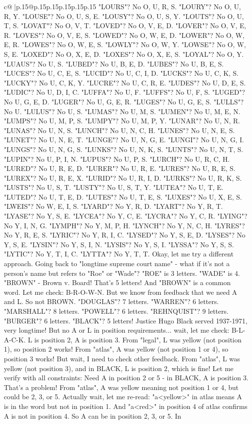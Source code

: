 \documentclass{article}
\begin{document}
{\begin{supertabular}{c@{$\;$}|p{.15\linewidth}@{}p{.15\linewidth}p{.15\linewidth}p{.15\linewidth}p{.15\linewidth}p{.15\linewidth}}
{{{"LOURS"? No O, U, R, S. "LOURY"? No O, U, R, Y. "LOUSE"? No O, U, S, E. "LOUSY"? No O, U, S, Y. "LOUTS"? No O, U, T, S. "LOVAT"? No O, V, T. "LOVED"? No O, V, E, D. "LOVER"? No O, V, E, R. "LOVES"? No O, V, E, S. "LOWED"? No O, W, E, D. "LOWER"? No O, W, E, R. "LOWES"? No O, W, E, S. "LOWLY"? No O, W, Y. "LOWSE"? No O, W, S, E. "LOXED"? No O, X, E, D. "LOXES"? No O, X, E, S. "LOYAL"? No O, Y. "LUAUS"? No U, S. "LUBED"? No U, B, E, D. "LUBES"? No U, B, E, S. "LUCES"? No U, C, E, S. "LUCID"? No U, C, I, D. "LUCKS"? No U, C, K, S. "LUCKY"? No U, C, K, Y. "LUCRE"? No U, C, R, E. "LUDES"? No U, D, E, S. "LUDIC"? No U, D, I, C. "LUFFA"? No U, F. "LUFFS"? No U, F, S. "LUGED"? No U, G, E, D. "LUGER"? No U, G, E, R. "LUGES"? No U, G, E, S. "LULLS"? No U. "LULUS"? No U, S. "LUMAS"? No U, M, S. "LUMEN"? No U, M, E, N. "LUMPS"? No U, M, P, S. "LUMPY"? No U, M, P, Y. "LUNAR"? No U, N, R. "LUNAS"? No U, N, S. "LUNCH"? No U, N, C, H. "LUNES"? No U, N, E, S. "LUNET"? No U, N, E, T. "LUNGE"? No U, N, G, E. "LUNGI"? No U, N, G, I. "LUNGS"? No U, N, G, S. "LUNKS"? No U, N, K, S. "LUNTS"? No U, N, T, S. "LUPIN"? No U, P, I, N. "LUPUS"? No U, P, S. "LURCH"? No U, R, C, H. "LURED"? No U, R, E, D. "LURER"? No U, R, E. "LURES"? No U, R, E, S. "LUREX"? No U, R, E, X. "LURID"? No U, R, I, D. "LURKS"? No U, R, K, S. "LUSTS"? No U, S, T. "LUSTY"? No U, S, T, Y. "LUTEA"? No U, T, E. "LUTED"? No U, T, E, D. "LUTES"? No U, T, E, S. "LUXES"? No U, X, E, S. "LWEIS"? No W, E, I, S. "LYARD"? No Y, R, D. "LYART"? No Y, R, T. "LYASE"? No Y, S, E. "LYCEA"? No Y, C, E. "LYCRA"? No Y, C, R. "LYING"? No Y, I, N, G. "LYMPH"? No Y, M, P, H. "LYNCH"? No Y, N, C, H. "LYRES"? No Y, R, E, S. "LYRIC"? No Y, R, I, C. "LYSED"? No Y, S, E, D. "LYSES"? No Y, S, E. "LYSIN"? No Y, S, I, N. "LYSIS"? No Y, S, I. "LYSSA"? No Y, S, S. "LYTIC"? No Y, T, I, C. "LYTTA"? No Y, T, T. Okay, let me try a different approach. Going back to "longtime supreme court name" {-} what if it's not a person's name but refers to "Roe" or "Wade"? "ROE" is 3 letters. "WADE" is 4. "BROWN" {-} Brown v. Board! That's 5 letters! And "BROWN" is a common word. Let me check: B{-}R{-}O{-}W{-}N. But we know from feedback that we need A and L. So not BROWN. "DOUGLAS"? 7 letters. "WARREN"? 6 letters. "MARSHALL"? 8 letters. "POWELL"? 6 letters. "REHNQUIST"? 9 letters. "BURGER"? 6 letters. "BLACK"? 5 letters! Justice Hugo Black served 1937{-}1971, very longtime! But no A or L in position requirements... wait, let me check: B{-}L{-}A{-}C{-}K. L is position 2, A is position 3. From "legal", L was yellow (not position 1), so position 2 works! From "atlas", A was yellow (not position 1 or 4), so position 3 works! But wait, I need to check other feedback. From "atlas", L was yellow (not position 3), and in BLACK, L is position 2, which is fine! Let me verify with all constraints: Need A in position 2 or 5 {-} in BLACK, A is position 3. That's a problem! From "atlas", A was yellow meaning not position 1 or 4, but could be 2, 3, or 5. Actually wait, let me re{-}read: "a<yellow>" in atlas means A is in the word but not in position 1. And "a<red>" in position 4 of atlas confirms A is not in position 4. So A can be in position 2, 3, or 5. In }}}
\end{supertabular}}
\end{document}
